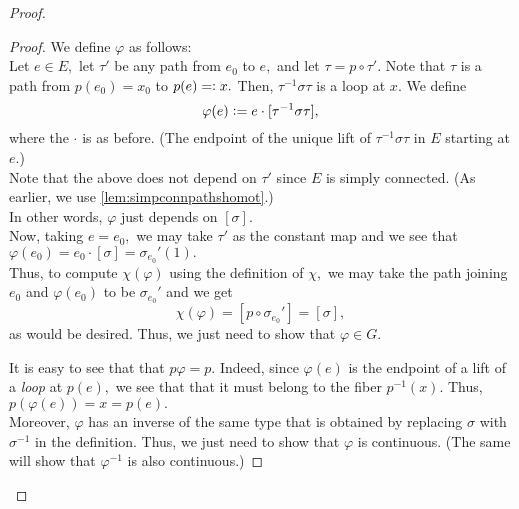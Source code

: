 \documentclass[12pt]{article}
\newenvironment{blockquote}
{\begin{mdframed}[skipabove=0pt, skipbelow=0pt, innertopmargin=4pt, innerbottommargin=4pt, bottomline=false,topline=false,rightline=false, linewidth=2pt]}
{\end{mdframed}}
\begin{document}
\begin{proof}
\begin{blockquote}
\begin{proof}
			We define $\varphi$ as follows:\\
			Let $e \in E,$ let $\tau'$ be any path from $e_0$ to $e,$ and let $\tau = p\circ\tau'.$ Note that $\tau$ is a path from $p(e_0) = x_0$ to $p(e) =\vcentcolon x.$ Then, $\tau^{-1}\sigma\tau$ is a loop at $x.$ We define
			\begin{equation*} 
				\varphi(e) \vcentcolon= e\cdot[\tau^{-1}\sigma\tau],
			\end{equation*}
			where the $\cdot$ is as before. (The endpoint of the unique lift of $\tau^{-1}\sigma\tau$ in $E$ starting at $e.$)\\
			Note that the above does not depend on $\tau'$ since $E$ is simply connected. (As earlier, we use \cref{lem:simpconnpathshomot}.)\\
			In other words, $\varphi$ just depends on $[\sigma].$\\
			Now, taking $e = e_0,$ we may take $\tau'$ as the constant map and we see that $\varphi(e_0) = e_0\cdot[\sigma] = \sigma_{e_0}'(1).$\\
			Thus, to compute $\chi(\varphi)$ using the definition of $\chi,$ we may take the path joining $e_0$ and $\varphi(e_0)$ to be $\sigma_{e_0}'$ and we get
			\begin{equation*} 
				\chi(\varphi) = [p \circ \sigma_{e_0}'] = [\sigma],
			\end{equation*}
			as would be desired. Thus, we just need to show that $\varphi \in G.$

			It is easy to see that that $p\varphi = p.$ Indeed, since $\varphi(e)$ is the endpoint of a lift of a \emph{loop} at $p(e),$ we see that that it must belong to the fiber $p^{-1}(x).$ Thus, $p(\varphi(e)) = x = p(e).$\\
			Moreover, $\varphi$ has an inverse of the same type that is obtained by replacing $\sigma$ with $\sigma^{-1}$ in the definition. Thus, we just need to show that $\varphi$ is continuous. (The same will show that $\varphi^{-1}$ is also continuous.)


\end{proof}
\end{blockquote}
\end{proof}
\end{document}
